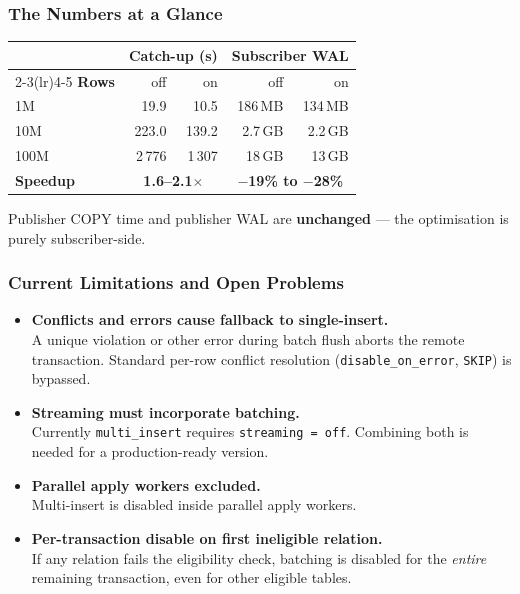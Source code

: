 \documentclass{beamer}
\begin{document}
\begin{frame}\frametitle{The Numbers at a Glance}
\begin{center}
\begin{tabular}{l rr rr}
  \toprule
  & \multicolumn{2}{c}{\textbf{Catch-up (s)}}
  & \multicolumn{2}{c}{\textbf{Subscriber WAL}} \\
  \cmidrule(lr){2-3}\cmidrule(lr){4-5}
  \textbf{Rows} & off & on & off & on \\
  \midrule
  1M   & 19.9   & 10.5   & 186\,MB  & 134\,MB \\
  10M  & 223.0  & 139.2  & 2.7\,GB  & 2.2\,GB \\
  100M & 2\,776 & 1\,307 & 18\,GB   & 13\,GB  \\
  \midrule
  \textbf{Speedup} & \multicolumn{2}{c}{\textbf{1.6--2.1$\times$}}
                    & \multicolumn{2}{c}{\textbf{$-$19\% to $-$28\%}} \\
  \bottomrule
\end{tabular}
\end{center}
\bigskip
Publisher COPY time and publisher WAL are \textbf{unchanged} ---
the optimisation is purely subscriber-side.
\end{frame}


\begin{frame}\frametitle{Current Limitations and Open Problems}
\begin{itemize}
  \item \textbf{Conflicts and errors cause fallback to single-insert.}\\
        {\small A unique violation or other error during batch flush aborts
        the remote transaction. Standard per-row conflict resolution
        (\texttt{disable\_on\_error}, \texttt{SKIP}) is bypassed.}
  \medskip
  \item \textbf{Streaming must incorporate batching.}\\
        {\small Currently \texttt{multi\_insert} requires
        \texttt{streaming = off}. Combining both is needed for
        a production-ready version.}
  \medskip
  \item \textbf{Parallel apply workers excluded.}\\
        {\small Multi-insert is disabled inside parallel apply workers.}
  \medskip
  \item \textbf{Per-transaction disable on first ineligible relation.}\\
        {\small If any relation fails the eligibility check, batching is
        disabled for the \emph{entire} remaining transaction, even for
        other eligible tables.}
\end{itemize}
\end{frame}
\end{document}
